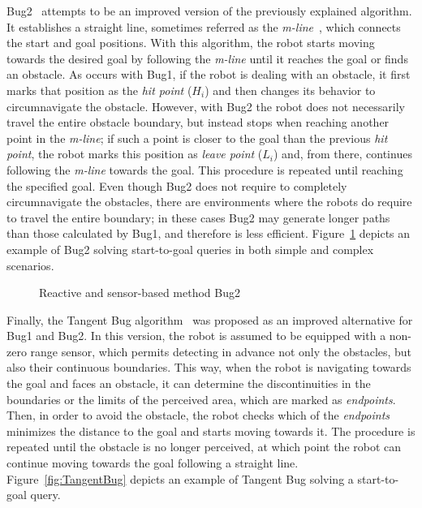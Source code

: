 Bug2~\cite{Lumelsky1987} attempts to be an improved version of the previously
explained algorithm. It establishes a straight line, sometimes referred as the
\textit{m-line}~\cite{Choset2005}, which connects the start and goal positions.
With this algorithm, the robot starts moving towards the desired goal by
following the \textit{m-line} until it reaches the goal or finds an obstacle. As
occurs with Bug1, if the robot is dealing with an obstacle, it first marks that
position as the \textit{hit point} ($H_i$) and then changes its behavior to
circumnavigate the obstacle. However, with Bug2 the robot does not necessarily
travel the entire obstacle boundary, but instead stops when reaching another
point in the \textit{m-line}; if such a point is closer to the goal than the
previous \textit{hit point}, the robot marks this position as \textit{leave
point} ($L_i$) and, from there, continues following the \textit{m-line} towards
the goal. This procedure is repeated until reaching the specified goal. Even
though Bug2 does not require to completely circumnavigate the obstacles, there
are environments where the robots do require to travel the entire boundary; in
these cases Bug2 may generate longer paths than those calculated by Bug1, and
therefore is less efficient. Figure~\ref{fig:Bug2} depicts an example of Bug2
solving start-to-goal queries in both simple and complex scenarios.

\begin{figure}[htbp]
    \myfloatalign
     \quad
\caption[Reactive and sensor-based method Bug2.]
{Reactive and sensor-based method Bug2}
\label{fig:Bug2}
\end{figure}
 
Finally, the Tangent Bug algorithm~\cite{Kamon1996} was proposed as an improved
alternative for Bug1 and Bug2. In this version, the robot is assumed to be
equipped with a non-zero range sensor, which permits detecting in advance not
only the obstacles, but also their continuous boundaries. This way, when the
robot is navigating towards the goal and faces an obstacle, it can determine the
discontinuities in the boundaries or the limits of the perceived area, which are
marked as \textit{endpoints}. Then, in order to avoid the obstacle, the robot
checks which of the \textit{endpoints} minimizes the distance to the goal and
starts moving towards it. The procedure is repeated until the obstacle is no
longer perceived, at which point the robot can continue moving towards the goal
following a straight line. Figure~\ref{fig:TangentBug} depicts an example of
Tangent Bug solving a start-to-goal query.
 
